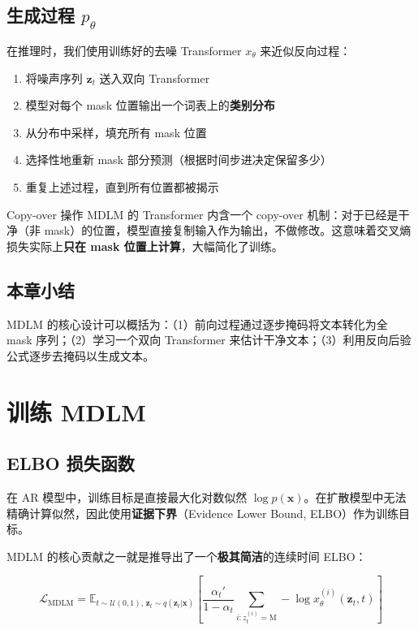 \documentclass[a4paper]{article}
\begin{document}
\subsection{生成过程 $p_\theta$}

在推理时，我们使用训练好的去噪 Transformer $x_\theta$ 来近似反向过程：

\begin{enumerate}
    \item 将噪声序列 $\mathbf{z}_t$ 送入双向 Transformer
    \item 模型对每个 mask 位置输出一个词表上的\textbf{类别分布}
    \item 从分布中采样，填充所有 mask 位置
    \item 选择性地重新 mask 部分预测（根据时间步进决定保留多少）
    \item 重复上述过程，直到所有位置都被揭示
\end{enumerate}

\begin{knowledgebox}{Copy-over 操作}
MDLM 的 Transformer 内含一个 copy-over 机制：对于已经是干净（非 mask）的位置，模型直接复制输入作为输出，不做修改。这意味着交叉熵损失实际上\textbf{只在 mask 位置上计算}，大幅简化了训练。
\end{knowledgebox}

\subsection{本章小结}

MDLM 的核心设计可以概括为：（1）前向过程通过逐步掩码将文本转化为全 mask 序列；（2）学习一个双向 Transformer 来估计干净文本；（3）利用反向后验公式逐步去掩码以生成文本。

\newpage
\section{训练 MDLM}

\subsection{ELBO 损失函数}

在 AR 模型中，训练目标是直接最大化对数似然 $\log p(\mathbf{x})$。在扩散模型中无法精确计算似然，因此使用\textbf{证据下界}（Evidence Lower Bound, ELBO）作为训练目标。

MDLM 的核心贡献之一就是推导出了一个\textbf{极其简洁}的连续时间 ELBO：

$$\mathcal{L}_{\text{MDLM}} = \mathbb{E}_{t \sim \mathcal{U}(0,1), \, \mathbf{z}_t \sim q(\mathbf{z}_t|\mathbf{x})} \left[ \frac{\alpha_t'}{1 - \alpha_t} \sum_{i: z_t^{(i)} = \text{M}} -\log x_\theta^{(i)}(\mathbf{z}_t, t) \right]$$
\end{document}
